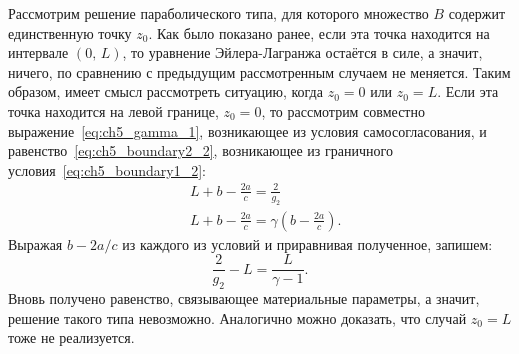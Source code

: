 Рассмотрим решение параболического типа, для которого множество $B$ содержит единственную точку $z_0$.
Как было показано ранее, если эта точка находится на интервале $(0,\, L)$, то уравнение Эйлера-Лагранжа остаётся в силе, а значит, ничего, по сравнению с предыдущим рассмотренным случаем не меняется.
Таким образом, имеет смысл рассмотреть ситуацию, когда $z_0 = 0$ или $z_0 = L$.
Если эта точка находится на левой границе, $z_0 = 0$, то рассмотрим совместно выражение~\eqref{eq:ch5_gamma_1}, возникающее из условия самосогласования, и равенство~\eqref{eq:ch5_boundary2_2}, возникающее из граничного условия~\eqref{eq:ch5_boundary1_2}:
\begin{subequations}
	\begin{align}
		&L+b-\frac{2a}{c} = \frac{2}{g_2}\\
		&L + b - \frac{2a}{c} = \gamma \left(b - \frac{2a}{c}\right).
	\end{align}
\end{subequations}
Выражая $b - 2a/c$ из каждого из условий и приравнивая полученное, запишем:
\begin{equation}
\frac{2}{g_2} - L = \frac{L}{\gamma - 1}.
\end{equation}
Вновь получено равенство, связывающее материальные параметры, а значит, решение такого типа невозможно. Аналогично можно доказать, что случай $z_0 = L$ тоже не реализуется.

